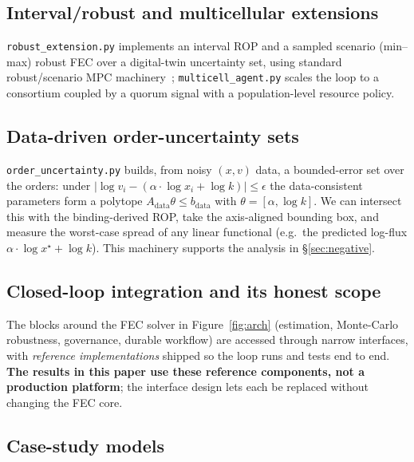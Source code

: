 \documentclass[11pt]{article}
\begin{document}
\subsection{Interval/robust and multicellular extensions}\label{sec:robust}

\texttt{robust\_extension.py} implements an interval ROP and a sampled
scenario (min--max) robust FEC over a digital-twin uncertainty set, using
standard robust/scenario MPC machinery~\citep{kothare1996robust,scokaert1998minmax,
mayne2005tube,calafiore2006scenario,campi2008exact,bertsimas2011robust};
\texttt{multicell\_agent.py} scales the loop to a consortium coupled by a quorum
signal with a population-level resource policy.

\subsection{Data-driven order-uncertainty sets}\label{sec:orderuq}

\texttt{order\_uncertainty.py} builds, from noisy $(x,v)$ data, a bounded-error
set over the orders: under $|\log v_i - (\alpha\!\cdot\!\log x_i + \log k)| \le
\epsilon$ the data-consistent parameters form a polytope $A_{\mathrm{data}}\theta
\le b_{\mathrm{data}}$ with $\theta=[\alpha,\log k]$. We can intersect this with
the binding-derived ROP, take the axis-aligned bounding box, and measure the
worst-case spread of any linear functional (e.g.\ the predicted log-flux
$\alpha\!\cdot\!\log x^\star + \log k$). This machinery supports the analysis in
\S\ref{sec:negative}.

\subsection{Closed-loop integration and its honest scope}\label{sec:integration}

The blocks around the FEC solver in Figure~\ref{fig:arch} (estimation,
Monte-Carlo robustness, governance, durable workflow) are accessed through narrow
interfaces, with \emph{reference implementations} shipped so the loop runs and
tests end to end. \textbf{The results in this paper use these reference
components, not a production platform}; the interface design lets each be replaced
without changing the FEC core.

\subsection{Case-study models}\label{sec:casestudy}
\end{document}

